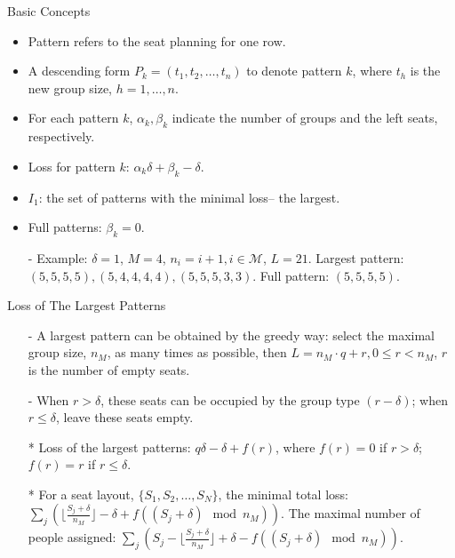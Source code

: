   \begin{frame}{Basic Concepts}
    \begin{itemize}
      \item Pattern refers to the seat planning for one row.
      \item A descending form $P_{k} = (t_1, t_2, \ldots, t_n)$ to denote pattern $k$, where $t_h$ is the new group size, $h = 1,\ldots, n$.
      \item For each pattern $k$, $\alpha_k, \beta_k$ indicate the number of groups and the left seats, respectively.
      \item Loss for pattern $k$: $\alpha_k \delta + \beta_k - \delta$.
      \item $I_1$: the set of patterns with the minimal loss-- the largest. 
      \item Full patterns: $\beta_k =0$.
      \item[-] Example: $\delta = 1$, $M =4$, $n_i = i+1, i \in \mathcal{M}$, $L = 21$.
      Largest pattern: $(5, 5, 5, 5), (5, 4, 4, 4, 4), (5, 5, 5, 3, 3)$.
      Full pattern: $(5, 5, 5, 5)$. 
    \end{itemize}
  \end{frame}


  \begin{frame}{Loss of The Largest Patterns}
    \begin{itemize}
      \item[-] A largest pattern can be obtained by the greedy way: select the maximal group size, $n_{M}$, as many times as possible, then $L = n_{M} \cdot q + r, 0 \leq r < n_{M}$, $r$ is the number of empty seats. 
      \item[-] When $r > \delta$, these seats can be occupied by the group type $(r-\delta)$; when $r \leq \delta$, leave these seats empty.
      \item[*] Loss of the largest patterns: $q \delta -\delta + f(r)$, where $f(r) =0$ if $r > \delta$; $f(r) = r$ if $r \leq \delta$.
      \item[*] For a seat layout, $\{S_1, S_2, \ldots, S_{N}\}$, the minimal total loss: $\sum_{j} (\lfloor \frac{S_j+\delta}{n_{M}} \rfloor -\delta + f((S_j + \delta) \mod n_{M}))$. The maximal number of people assigned: $\sum_{j} (S_j - \lfloor \frac{S_j+\delta}{n_{M}} \rfloor + \delta - f((S_j +\delta)\mod n_{M}))$.
    \end{itemize}
  \end{frame}
  
